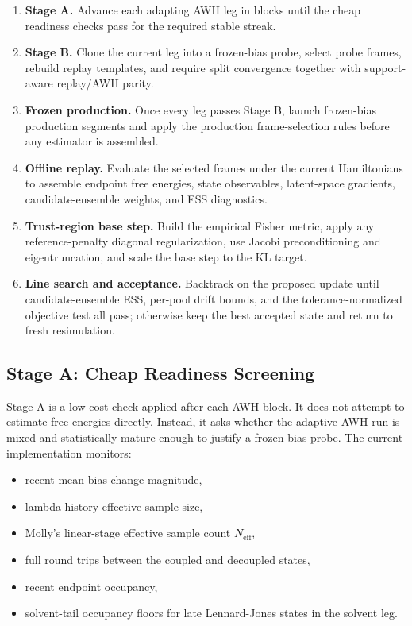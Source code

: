 \begin{enumerate}
    \item \textbf{Stage A.} Advance each adapting AWH leg in blocks until the cheap readiness checks pass for the required stable streak.
    \item \textbf{Stage B.} Clone the current leg into a frozen-bias probe, select probe frames, rebuild replay templates, and require split convergence together with support-aware replay/AWH parity.
    \item \textbf{Frozen production.} Once every leg passes Stage B, launch frozen-bias production segments and apply the production frame-selection rules before any estimator is assembled.
    \item \textbf{Offline replay.} Evaluate the selected frames under the current Hamiltonians to assemble endpoint free energies, state observables, latent-space gradients, candidate-ensemble weights, and ESS diagnostics.
    \item \textbf{Trust-region base step.} Build the empirical Fisher metric, apply any reference-penalty diagonal regularization, use Jacobi preconditioning and eigentruncation, and scale the base step to the KL target.
    \item \textbf{Line search and acceptance.} Backtrack on the proposed update until candidate-ensemble ESS, per-pool drift bounds, and the tolerance-normalized objective test all pass; otherwise keep the best accepted state and return to fresh resimulation.
\end{enumerate}

\subsection{Stage A: Cheap Readiness Screening}

Stage A is a low-cost check applied after each AWH block. It does not attempt to estimate free energies directly. Instead, it asks whether the adaptive AWH run is mixed and statistically mature enough to justify a frozen-bias probe. The current implementation monitors:

\begin{itemize}
    \item recent mean bias-change magnitude,
    \item lambda-history effective sample size,
    \item Molly's linear-stage effective sample count $N_{\mathrm{eff}}$,
    \item full round trips between the coupled and decoupled states,
    \item recent endpoint occupancy,
    \item solvent-tail occupancy floors for late Lennard-Jones states in the
    solvent leg.
\end{itemize}

